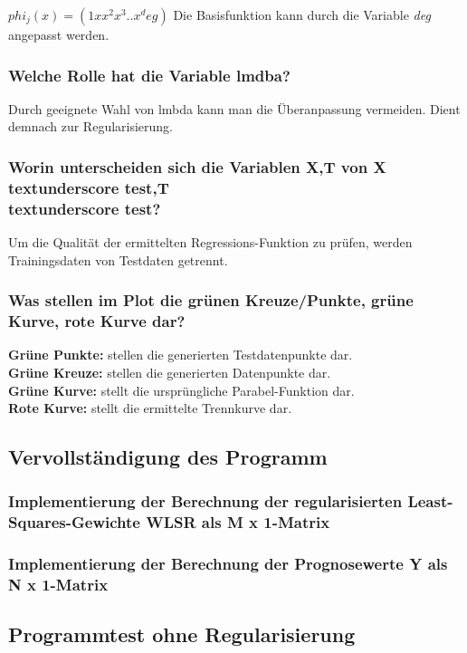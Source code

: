 $phi_j (x) = (1 x x^2 x^3 .. x^deg)$
Die Basisfunktion kann durch die Variable \textit{deg} angepasst werden.

\subsubsection{Welche Rolle hat die Variable lmdba?}
Durch geeignete Wahl von lmbda kann man die Überanpassung vermeiden.
Dient demnach zur Regularisierung.

\subsubsection{Worin unterscheiden sich die Variablen X,T von X\\textunderscore test,T\\textunderscore test?}
Um die Qualität der ermittelten Regressions-Funktion zu prüfen, werden Trainingsdaten von Testdaten getrennt.

\subsubsection{Was stellen im Plot die grünen Kreuze/Punkte, grüne Kurve, rote Kurve dar?}
\textbf{Grüne Punkte:} stellen die generierten Testdatenpunkte dar.\\
\textbf{Grüne Kreuze:} stellen die generierten Datenpunkte dar.\\
\textbf{Grüne Kurve:} stellt die ursprüngliche Parabel-Funktion dar.\\
\textbf{Rote Kurve:} stellt die ermittelte Trennkurve dar.

\subsection{Vervollständigung des Programm}

\subsubsection{Implementierung der Berechnung der regularisierten Least-Squares-Gewichte W\textunderscore LSR als M x 1-Matrix}

\subsubsection{Implementierung der Berechnung der Prognosewerte Y als N x 1-Matrix}

\subsection{Programmtest ohne Regularisierung}


